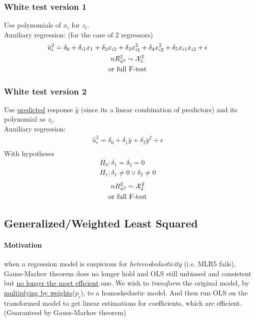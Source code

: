 \documentclass[]{article}
\begin{document}
			\subsubsection{White test version 1}
				\par Use polynomials of $x_i$ for $z_i$.\\
				Auxiliary regression: (for the case of 2 regressors)
				\begin{gather*}
					\hat{u}_i^2 = \delta_0 + \delta_{i1} x_1 + \delta_2 x_{i2} + \delta_3 x_{i1}^2 + \delta_4 x_{i2}^2 + \delta_5 x_{i1} x_{i2} + \epsilon \\
					n R^2_{\hat{u}^2} \sim \mathcal{{X}}_5^2 \\
					\text{{or full F-test}}
				\end{gather*}
			\subsubsection{White test version 2}
				\par Use \ul{predicted} response $\hat{y}$ (since its a linear combination of predictors) and its polynomial as $z_i$. \\
				Auxiliary regression:
				\begin{gather*}
					\hat{u}_i^2 = \delta_0 + \delta_1 \hat{y} + \delta_2 \hat{y}^2 + \epsilon \\
				\end{gather*}
				With hypotheses
				\begin{gather*}
					H_0: \delta_1 = \delta_2 = 0\\
					H_1: \delta_1 \neq 0 \lor \delta_2 \neq 0
				\end{gather*}
				\begin{gather*}
					n R^2_{\hat{u}^2} \sim \mathcal{{X}}_2^2 \\
					\text{{or full F-test}}
				\end{gather*}
		\subsection{Generalized/Weighted Least Squared}
			\paragraph{Motivation} when a regression model is suspicious for \emph{heteroskedasticity} (i.e. MLR5 fails), Gauss-Markov theorem does no longer hold and OLS still unbiased and consistent but \ul{no longer the most efficient} one. We wish to \emph{transform} the original model, by \ul{multiplying by weights}($p_i$), to a homoskedastic model. And then run OLS on the transformed model to get linear estimations for coefficients, which are efficient. (Guaranteed by Gauss-Markov theorem)
			
\end{document}
